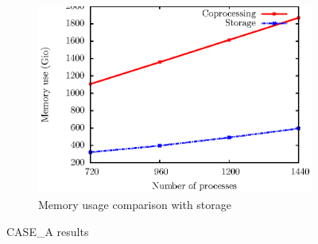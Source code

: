 \begin{figure}
        \begin{subfigure}[b]{0.40\linewidth}
                \includegraphics[scale=0.60]{pictures/test3.ps}
                \caption{Memory usage comparison with storage}
                \label{fig:mem}
        \end{subfigure}
        \caption{CASE\_A results}\label{fig:animals}
\end{figure}

